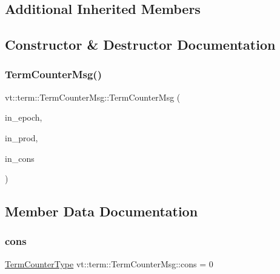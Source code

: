 \subsection*{Additional Inherited Members}


\subsection{Constructor \& Destructor Documentation}
\mbox{\label{structvt_1_1term_1_1_term_counter_msg_a5728a2f05ae6a3ccf0cac09098983b0f}} 
\subsubsection{\texorpdfstring{Term\+Counter\+Msg()}{TermCounterMsg()}}
{\footnotesize\ttfamily vt\+::term\+::\+Term\+Counter\+Msg\+::\+Term\+Counter\+Msg (\begin{DoxyParamCaption}\item[{\hyperlink{namespacevt_a81d11b28122d43bf9834577e4a06440f}{Epoch\+Type} const}]{in\+\_\+epoch,  }\item[{\hyperlink{namespacevt_1_1term_a4fd378cdb0c36683afc1b3399d685f7f}{Term\+Counter\+Type} const}]{in\+\_\+prod,  }\item[{\hyperlink{namespacevt_1_1term_a4fd378cdb0c36683afc1b3399d685f7f}{Term\+Counter\+Type} const}]{in\+\_\+cons }\end{DoxyParamCaption})\hspace{0.3cm}{\ttfamily [inline]}}



\subsection{Member Data Documentation}
\mbox{\label{structvt_1_1term_1_1_term_counter_msg_a212c8487c01cd837aae027823fa32208}} 
\subsubsection{\texorpdfstring{cons}{cons}}
{\footnotesize\ttfamily \hyperlink{namespacevt_1_1term_a4fd378cdb0c36683afc1b3399d685f7f}{Term\+Counter\+Type} vt\+::term\+::\+Term\+Counter\+Msg\+::cons = 0}

